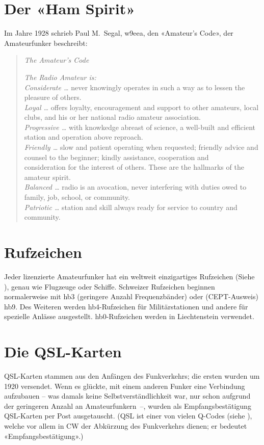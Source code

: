 \section{Der «Ham Spirit»}
Im Jahre 1928 schrieb Paul M.~Segal, w9eea, den «Amateur's Code», der Amateurfunker beschreibt:

\begin{quotation}
\textit{The Amateur's Code}

\vspace{1em}
\noindent
\textit{The Radio Amateur is:}\\
\textit{Considerate …} never knowingly operates in such a way as to lessen the pleasure of others. \\
\textit{Loyal …} offers loyalty, encouragement and support to other amateurs, local clubs, and his or her national radio amateur association. \\
\textit{Progressive …} with knowkedge abreast of science, a well-built and efficient station and operation above reproach. \\
\textit{Friendly …} slow and patient operating when requested; friendly advice and counsel to the beginner; kindly assistance, cooperation and \\ consideration for the interest of others. These are the hallmarks of the amateur spirit. \\
\textit{Balanced …} radio is an avocation, never interfering with duties owed to family, job, school, or community. \\
\textit{Patriotic …} station and skill always ready for service to country and community.
 
\end{quotation}


\section{Rufzeichen}
Jeder lizenzierte Amateurfunker hat ein weltweit einzigartiges Rufzeichen (Siehe ), genau wie Flugzeuge oder Schiffe. Schweizer Rufzeichen beginnen normalerweise mit hb3 (geringere Anzahl Frequenzbänder) oder (CEPT-Ausweis) hb9. Des Weiteren werden hb4-Rufzeichen für Militärstationen und andere für spezielle Anlässe ausgestellt. hb0-Rufzeichen werden in Liechtenstein verwendet.

\section{Die QSL-Karten}\label{sec:qsl}
QSL-Karten stammen aus den Anfängen des Funkverkehrs; die ersten wurden um 1920 versendet. Wenn es glückte, mit einem anderen Funker eine Verbindung aufzubauen -- was damals keine Selbstverständlichkeit war, nur schon aufgrund der geringeren Anzahl an Amateurfunkern~--, wurden als Empfangsbestätigung QSL-Karten per Post ausgetauscht. (QSL ist einer von vielen Q-Codes (siehe ), welche vor allem in CW der Abkürzung des Funkverkehrs dienen; er bedeutet «Empfangsbestätigung».)

